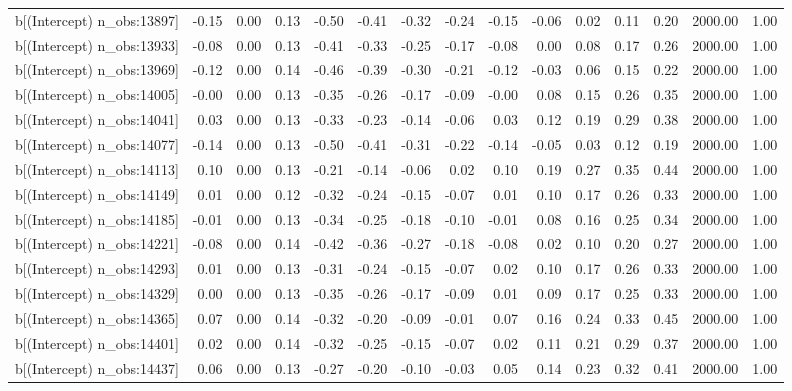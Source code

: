 \begin{table}[ht]
\begin{tabular}{rrrrrrrrrrrrrrr}
  b[(Intercept) n\_obs:13897] & -0.15 & 0.00 & 0.13 & -0.50 & -0.41 & -0.32 & -0.24 & -0.15 & -0.06 & 0.02 & 0.11 & 0.20 & 2000.00 & 1.00 \\ 
  b[(Intercept) n\_obs:13933] & -0.08 & 0.00 & 0.13 & -0.41 & -0.33 & -0.25 & -0.17 & -0.08 & 0.00 & 0.08 & 0.17 & 0.26 & 2000.00 & 1.00 \\ 
  b[(Intercept) n\_obs:13969] & -0.12 & 0.00 & 0.14 & -0.46 & -0.39 & -0.30 & -0.21 & -0.12 & -0.03 & 0.06 & 0.15 & 0.22 & 2000.00 & 1.00 \\ 
  b[(Intercept) n\_obs:14005] & -0.00 & 0.00 & 0.13 & -0.35 & -0.26 & -0.17 & -0.09 & -0.00 & 0.08 & 0.15 & 0.26 & 0.35 & 2000.00 & 1.00 \\ 
  b[(Intercept) n\_obs:14041] & 0.03 & 0.00 & 0.13 & -0.33 & -0.23 & -0.14 & -0.06 & 0.03 & 0.12 & 0.19 & 0.29 & 0.38 & 2000.00 & 1.00 \\ 
  b[(Intercept) n\_obs:14077] & -0.14 & 0.00 & 0.13 & -0.50 & -0.41 & -0.31 & -0.22 & -0.14 & -0.05 & 0.03 & 0.12 & 0.19 & 2000.00 & 1.00 \\ 
  b[(Intercept) n\_obs:14113] & 0.10 & 0.00 & 0.13 & -0.21 & -0.14 & -0.06 & 0.02 & 0.10 & 0.19 & 0.27 & 0.35 & 0.44 & 2000.00 & 1.00 \\ 
  b[(Intercept) n\_obs:14149] & 0.01 & 0.00 & 0.12 & -0.32 & -0.24 & -0.15 & -0.07 & 0.01 & 0.10 & 0.17 & 0.26 & 0.33 & 2000.00 & 1.00 \\ 
  b[(Intercept) n\_obs:14185] & -0.01 & 0.00 & 0.13 & -0.34 & -0.25 & -0.18 & -0.10 & -0.01 & 0.08 & 0.16 & 0.25 & 0.34 & 2000.00 & 1.00 \\ 
  b[(Intercept) n\_obs:14221] & -0.08 & 0.00 & 0.14 & -0.42 & -0.36 & -0.27 & -0.18 & -0.08 & 0.02 & 0.10 & 0.20 & 0.27 & 2000.00 & 1.00 \\ 
  b[(Intercept) n\_obs:14293] & 0.01 & 0.00 & 0.13 & -0.31 & -0.24 & -0.15 & -0.07 & 0.02 & 0.10 & 0.17 & 0.26 & 0.33 & 2000.00 & 1.00 \\ 
  b[(Intercept) n\_obs:14329] & 0.00 & 0.00 & 0.13 & -0.35 & -0.26 & -0.17 & -0.09 & 0.01 & 0.09 & 0.17 & 0.25 & 0.33 & 2000.00 & 1.00 \\ 
  b[(Intercept) n\_obs:14365] & 0.07 & 0.00 & 0.14 & -0.32 & -0.20 & -0.09 & -0.01 & 0.07 & 0.16 & 0.24 & 0.33 & 0.45 & 2000.00 & 1.00 \\ 
  b[(Intercept) n\_obs:14401] & 0.02 & 0.00 & 0.14 & -0.32 & -0.25 & -0.15 & -0.07 & 0.02 & 0.11 & 0.21 & 0.29 & 0.37 & 2000.00 & 1.00 \\ 
  b[(Intercept) n\_obs:14437] & 0.06 & 0.00 & 0.13 & -0.27 & -0.20 & -0.10 & -0.03 & 0.05 & 0.14 & 0.23 & 0.32 & 0.41 & 2000.00 & 1.00 \\ 

\end{tabular}
\end{table}
